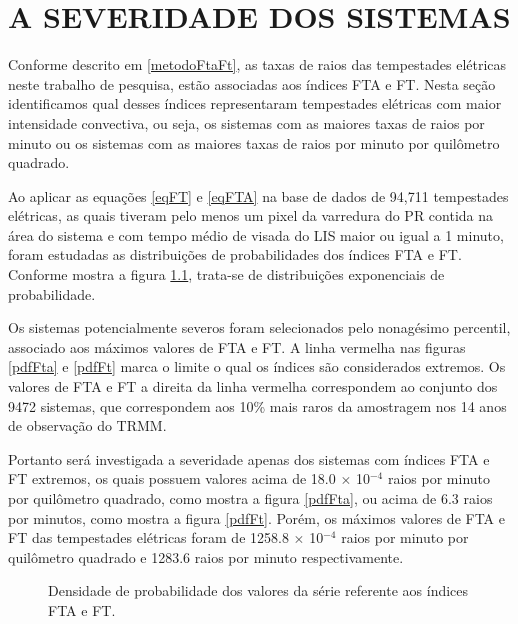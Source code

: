 \chapter{A SEVERIDADE DOS SISTEMAS}

Conforme descrito em \ref{metodoFtaFt}, as taxas de raios das tempestades elétricas neste trabalho de pesquisa, estão associadas aos índices FTA e FT.  Nesta seção identificamos qual desses índices representaram tempestades elétricas com maior intensidade convectiva, ou seja, os sistemas com as maiores taxas de raios por minuto ou os sistemas com as maiores taxas de raios por minuto por quilômetro quadrado. 

Ao aplicar as equações \ref{eqFT} e \ref{eqFTA} na base de dados de 94,711 tempestades elétricas, as quais tiveram pelo menos um pixel da varredura do PR contida na área do sistema e com tempo médio de visada do LIS maior ou igual a 1 minuto, foram estudadas as distribuições de probabilidades dos índices FTA e FT. Conforme mostra a figura \ref{seriesFtaFt}, trata-se de distribuições exponenciais de probabilidade. 

Os sistemas potencialmente severos foram selecionados pelo nonagésimo percentil, associado aos máximos valores de FTA e FT. A linha vermelha nas figuras \ref{pdfFta} e \ref{pdfFt} marca o limite o qual os índices são considerados extremos. Os valores de FTA e FT a direita da linha vermelha correspondem ao conjunto dos 9472 sistemas, que correspondem aos 10\% mais raros da amostragem nos 14 anos de observação do TRMM.  

Portanto será investigada a severidade apenas dos sistemas com índices FTA e FT extremos, os quais possuem valores acima de 18.0 $\times$ 10$^{-4}$ raios por minuto por quilômetro quadrado, como mostra a figura \ref{pdfFta}, ou acima de 6.3 raios por minutos, como mostra a figura \ref{pdfFt}. Porém, os máximos valores de FTA e FT das tempestades elétricas foram de 1258.8 $\times$ 10$^{-4}$ raios por minuto por quilômetro quadrado e 1283.6 raios por minuto respectivamente. 
 
\begin{figure}[!ht]
  \centering 
   \caption{Densidade de probabilidade dos valores da série referente aos índices FTA e FT.}
   \label{seriesFtaFt}
\end{figure}


